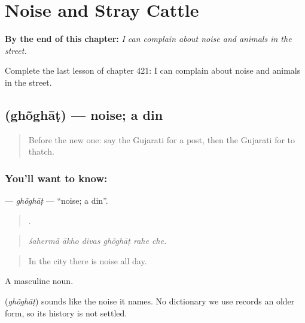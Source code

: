 
\chapter{Noise and Stray Cattle}
\label{ch:gu-noise-and-stray-cattle}

\begin{chapteropening}
\textbf{By the end of this chapter:} \emph{I can complain about noise and animals in the street.}

Complete the last lesson of chapter 421: I can complain about noise and animals in the street.
\end{chapteropening}

\section[\texorpdfstring{\gu{ઘોંઘાટ} (ghõghāṭ)}{ઘોંઘાટ (ghõghāṭ)}]{ (ghõghāṭ) — noise; a din}

\label{lesson:GU-C421-ghoghat}



\begin{quote}
Before the new one: say the Gujarati for a post, then the Gujarati for to thatch.
\end{quote}

\subsection*{You'll want to know: }
\textbf{} — \emph{ghõghāṭ} — \textquotedblleft{}noise; a din\textquotedblright{}.

\begin{quote}
     .
\end{quote}

\begin{quote}
\emph{śahermā̃ ākho divas ghõghāṭ rahe che.}
\end{quote}

\begin{quote}
In the city there is noise all day.
\end{quote}

A masculine noun.

\begin{cousinweb}
\textbf{} (\emph{ghõghāṭ}) sounds like the noise it names. No dictionary we use records an older form, so its history is not settled.
\end{cousinweb}

